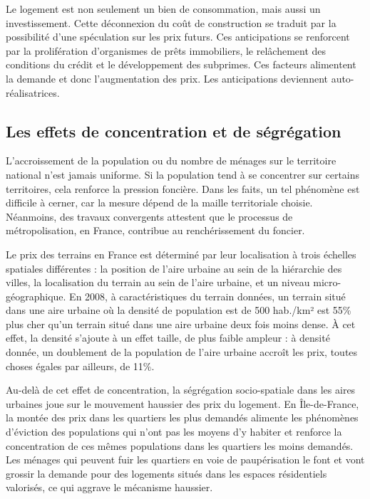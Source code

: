 \documentclass[a4paper, 12pt]{report}
\begin{document}
Le logement est non seulement un bien de consommation, mais aussi un investissement. Cette déconnexion du coût de construction se traduit par la possibilité d’une spéculation sur les prix futurs. Ces anticipations se renforcent par la prolifération d’organismes de prêts immobiliers, le relâchement des conditions du crédit et le développement des subprimes. Ces facteurs alimentent la demande et donc l’augmentation des prix. Les anticipations deviennent auto-réalisatrices.

\subsection{Les effets de concentration et de ségrégation}

L’accroissement de la population ou du nombre de ménages sur le territoire national n’est jamais uniforme. Si la population tend à se concentrer sur certains territoires, cela renforce la pression foncière. Dans les faits, un tel phénomène est difficile à cerner, car la mesure dépend de la maille territoriale choisie. Néanmoins, des travaux convergents attestent que le processus de métropolisation, en France, contribue au renchérissement du foncier.

Le prix des terrains en France est déterminé par leur localisation à trois échelles spatiales différentes : la position de l’aire urbaine au sein de la hiérarchie des villes, la localisation du terrain au sein de l’aire urbaine, et un niveau micro-géographique. En 2008, à caractéristiques du terrain données, un terrain situé dans une aire urbaine où la densité de population est de 500 hab./km² est 55\% plus cher qu’un terrain situé dans une aire urbaine deux fois moins dense. À cet effet, la densité s’ajoute à un effet taille, de plus faible ampleur : à densité donnée, un doublement de la population de l’aire urbaine accroît les prix, toutes choses égales par ailleurs, de 11\%.

Au-delà de cet effet de concentration, la ségrégation socio-spatiale dans les aires urbaines joue sur le mouvement haussier des prix du logement. En Île-de-France, la montée des prix dans les quartiers les plus demandés alimente les phénomènes d’éviction des populations qui n’ont pas les moyens d’y habiter et renforce la concentration de ces mêmes populations dans les quartiers les moins demandés. Les ménages qui peuvent fuir les quartiers en voie de paupérisation le font et vont grossir la demande pour des logements situés dans les espaces résidentiels valorisés, ce qui aggrave le mécanisme haussier.
\end{document}
